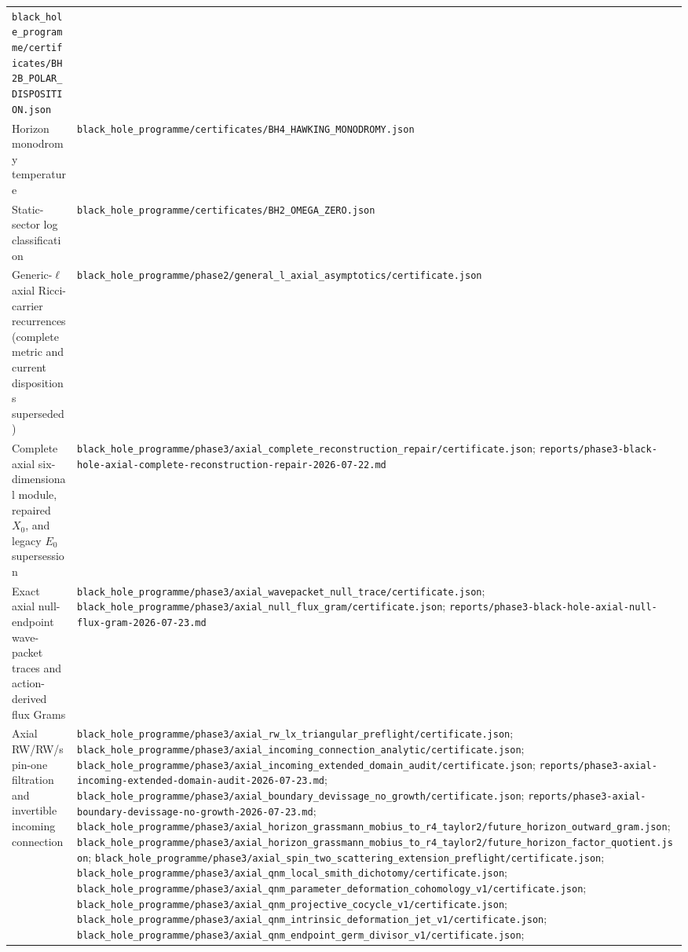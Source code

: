 \documentclass[11pt]{article}
\theoremstyle{definition}
\theoremstyle{remark}
\newcommand{\cert}[1]{\nolinkurl{#1}}
\begin{document}
{\begin{longtable}{@{}p{}p{}@{}}
\cert{black_hole_programme/certificates/BH2B_POLAR_DISPOSITION.json}\\
Horizon monodromy temperature &
\cert{black_hole_programme/certificates/BH4_HAWKING_MONODROMY.json}\\
Static-sector log classification &
\cert{black_hole_programme/certificates/BH2_OMEGA_ZERO.json}\\
Generic-\(\ell\) axial Ricci-carrier recurrences (complete metric and current
dispositions superseded) &
\cert{black_hole_programme/phase2/general_l_axial_asymptotics/certificate.json}\\
Complete axial six-dimensional module, repaired \(X_0\), and legacy
\(E_0\) supersession &
\cert{black_hole_programme/phase3/axial_complete_reconstruction_repair/certificate.json};
\cert{reports/phase3-black-hole-axial-complete-reconstruction-repair-2026-07-22.md}\\
Exact axial null-endpoint wave-packet traces and action-derived flux Grams &
\cert{black_hole_programme/phase3/axial_wavepacket_null_trace/certificate.json};
\cert{black_hole_programme/phase3/axial_null_flux_gram/certificate.json};
\cert{reports/phase3-black-hole-axial-null-flux-gram-2026-07-23.md}\\
Axial RW/RW/spin-one filtration and invertible incoming connection &
\cert{black_hole_programme/phase3/axial_rw_lx_triangular_preflight/certificate.json};
\cert{black_hole_programme/phase3/axial_incoming_connection_analytic/certificate.json};
\cert{black_hole_programme/phase3/axial_incoming_extended_domain_audit/certificate.json};
\cert{reports/phase3-axial-incoming-extended-domain-audit-2026-07-23.md};
\cert{black_hole_programme/phase3/axial_boundary_devissage_no_growth/certificate.json};
\cert{reports/phase3-axial-boundary-devissage-no-growth-2026-07-23.md};
\cert{black_hole_programme/phase3/axial_horizon_grassmann_mobius_to_r4_taylor2/future_horizon_outward_gram.json};
\cert{black_hole_programme/phase3/axial_horizon_grassmann_mobius_to_r4_taylor2/future_horizon_factor_quotient.json};
\cert{black_hole_programme/phase3/axial_spin_two_scattering_extension_preflight/certificate.json};
\cert{black_hole_programme/phase3/axial_qnm_local_smith_dichotomy/certificate.json};
\cert{black_hole_programme/phase3/axial_qnm_parameter_deformation_cohomology_v1/certificate.json};
\cert{black_hole_programme/phase3/axial_qnm_projective_cocycle_v1/certificate.json};
\cert{black_hole_programme/phase3/axial_qnm_intrinsic_deformation_jet_v1/certificate.json};
\cert{black_hole_programme/phase3/axial_qnm_endpoint_germ_divisor_v1/certificate.json};

\end{longtable}}
\end{document}
